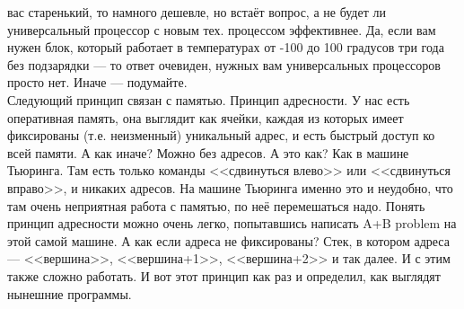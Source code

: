 \documentclass{article}
\begin{document}
вас старенький, то намного дешевле, но встаёт вопрос, а не будет ли универсальный процессор с новым тех. процессом эффективнее. Да, если вам нужен блок, который работает в температурах от -100 до 100 градусов три года без подзарядки --- то ответ очевиден, нужных вам универсальных процессоров просто нет. Иначе --- подумайте.\\
    Следующий принцип связан с памятью. Принцип адресности. У нас есть оперативная память, она выглядит как ячейки, каждая из которых имеет фиксированы (т.е. неизменный) уникальный адрес, и есть быстрый доступ ко всей памяти. А как иначе? Можно без адресов. А это как? Как в машине Тьюринга. Там есть только команды <<сдвинуться влево>> или <<сдвинуться вправо>>, и никаких адресов. На машине Тьюринга именно это и неудобно, что там очень неприятная работа с памятью, по неё перемешаться надо. Понять принцип адресности можно очень легко, попытавшись написать A+B problem на этой самой машине. А как если адреса не фиксированы? Стек, в котором адреса --- <<вершина>>, <<вершина+1>>, <<вершина+2>> и так далее. И с этим также сложно работать. И вот этот принцип как раз и определил, как выглядят нынешние программы.\\
\end{document}
